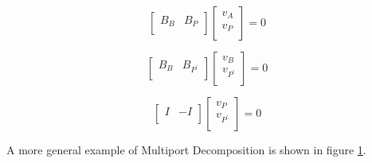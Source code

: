 \documentclass[10pt,psfig,letterpaper,twocolumn]{article}
\begin{document}
\begin{equation}
\left[\begin{array}{ll}
B_{B} & B_{P}\\
\end{array}\right]
\left[\begin{array}{l}
v_{A} \\
v_{P}\\
\end{array}\right]
= 0
\end{equation}

\begin{equation}
\left[\begin{array}{ll}
B_{B} & B_{P^{'}}\\
\end{array}\right]
\left[\begin{array}{l}
v_{B} \\
v_{P^{'}}\\
\end{array}\right]
= 0
\end{equation}

\begin{equation}
\left[\begin{array}{ll}
I & -I\\
\end{array}\right]
\left[\begin{array}{l}
v_{P} \\
v_{P^{'}}\\
\end{array}\right]
= 0
\end{equation}

A more general example of Multiport Decomposition is shown in figure \ref{multigen}.
\begin{figure}[!ht]
{\centering {} \par}
\caption{}
\label{multigen}
\end{figure}
\end{document}

